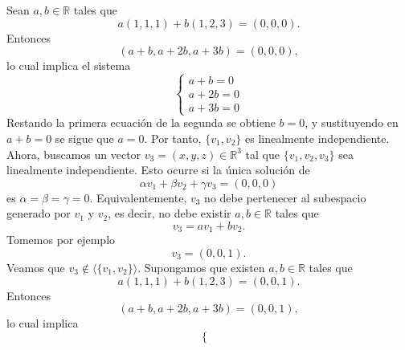 \documentclass[12pt,a4paper]{article}
\begin{document}
    \begin{solucion}
        Sean $a,b\in\mathbb{R}$ tales que
        \begin{equation*}
            a(1,1,1)+b(1,2,3)=(0,0,0).
        \end{equation*}
        Entonces
        \begin{equation*}
            (a+b,a+2b,a+3b)=(0,0,0),
        \end{equation*}
        lo cual implica el sistema
        \begin{equation*}
            \begin{cases}
                a+b=0\\
                a+2b=0\\
                a+3b=0
            \end{cases}
        \end{equation*}
        Restando la primera ecuación de la segunda se obtiene $b=0$,
        y sustituyendo en $a+b=0$ se sigue que $a=0$. Por tanto,
        $\{v_{1},v_{2}\}$ es linealmente independiente. Ahora,
        buscamos un vector $v_{3}=(x,y,z)\in\mathbb{R}^{3}$ tal que $\{v_{1},v_{2},v_{3}\}$
        sea linealmente independiente. Esto ocurre si la única solución de
        \begin{equation*}
            \alpha v_{1}+\beta v_{2}+\gamma v_{3}=(0,0,0)
        \end{equation*}
        es $\alpha=\beta=\gamma=0$. Equivalentemente, $v_{3}$ no debe pertenecer al subespacio
        generado por $v_{1}$ y $v_{2}$, es decir, no debe existir $a,b\in\mathbb{R}$ tales que
        \begin{equation*}
            v_{3}=av_{1}+bv_{2}.
        \end{equation*}
        Tomemos por ejemplo
        \begin{equation*}
            v_{3}=(0,0,1).
        \end{equation*}
        Veamos que $v_{3}\notin\langle\{ v_{1},v_{2}\}\rangle$. Supongamos que existen $a,b\in\mathbb{R}$
        tales que
        \begin{equation*}
            a(1,1,1)+b(1,2,3)=(0,0,1).
        \end{equation*}
        Entonces
        \begin{equation*}
            (a+b,a+2b,a+3b)=(0,0,1),
        \end{equation*}
        lo cual implica
        \begin{equation*}
            \begin{cases}

\end{cases}
\end{equation*}
\end{solucion}
\end{document}
